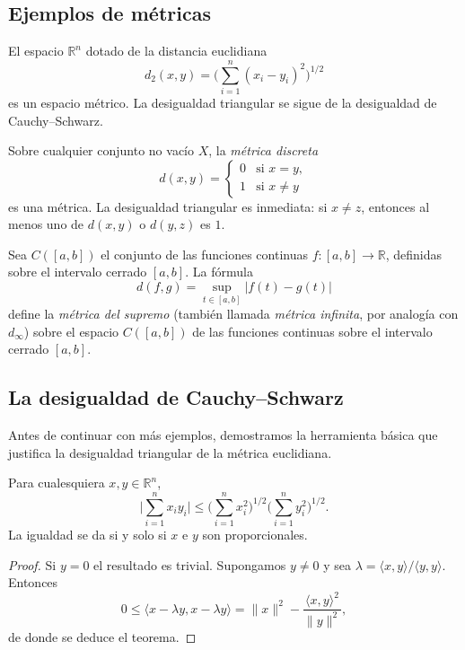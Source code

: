 \subsection{Ejemplos de métricas}

\begin{example}
\label{ej:euclidea}
El espacio $\mathbb{R}^n$ dotado de la distancia euclidiana
\begin{equation}\label{eq:euclidea}
  d_2(x,y)=\biggl(\sum_{i=1}^{n}(x_i-y_i)^2\biggr)^{1/2}
\end{equation}
es un espacio métrico. La desigualdad triangular se sigue de la desigualdad de Cauchy--Schwarz.
\end{example}

\begin{example}
\label{ej:discreta}
Sobre cualquier conjunto no vacío $X$, la \emph{métrica discreta}
\[
  d(x,y)=\begin{cases}0&\text{si }x=y,\\1&\text{si }x\neq y\end{cases}
\]
es una métrica. La desigualdad triangular es inmediata: si $x\neq z$, entonces al menos uno de $d(x,y)$ o $d(y,z)$ es $1$.
\end{example}

\begin{example}
\label{ej:supremo}
Sea $C([a,b])$ el conjunto de las funciones continuas $f\colon[a,b]\to\mathbb{R}$, definidas sobre el intervalo cerrado $[a,b]$. La fórmula
\begin{equation}\label{eq:supremo}
  d(f,g)=\sup_{t\in[a,b]}|f(t)-g(t)|
\end{equation}
define la \emph{métrica del supremo} (también llamada \emph{métrica infinita}, por analogía con $d_\infty$) sobre el espacio $C([a,b])$ de las funciones continuas sobre el intervalo cerrado $[a,b]$.
\end{example}

\subsection{La desigualdad de Cauchy--Schwarz}

Antes de continuar con más ejemplos, demostramos la herramienta básica que justifica la desigualdad triangular de la métrica euclidiana.

\begin{theorem}
\label{teo:cauchy-schwarz-cap5}
Para cualesquiera $x,y\in\mathbb{R}^n$,
\[
  \biggl|\sum_{i=1}^{n}x_i y_i\biggr|\leq\biggl(\sum_{i=1}^{n}x_i^2\biggr)^{1/2}\biggl(\sum_{i=1}^{n}y_i^2\biggr)^{1/2}.
\]
La igualdad se da si y solo si $x$ e $y$ son proporcionales.
\end{theorem}
\begin{proof}
Si $y=0$ el resultado es trivial. Supongamos $y\neq 0$ y sea $\lambda=\langle x,y\rangle/\langle y,y\rangle$. Entonces
\[
  0\leq\langle x-\lambda y,x-\lambda y\rangle=\|x\|^2-\frac{\langle x,y\rangle^2}{\|y\|^2},
\]
de donde se deduce el teorema.
\end{proof}

